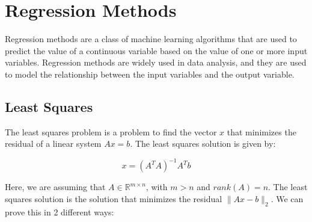 \section{Regression Methods}

Regression methods are a class of machine learning algorithms that are used to predict the value of a continuous
variable based on the value of one or more input variables. Regression methods are widely used in data analysis,
and they are used to model the relationship between the input variables and the output variable.

\subsection{Least Squares}

The least squares problem is a problem to find the vector $x$ that minimizes the residual of a linear system $A x = b$.
The least squares solution is given by:

\begin{equation}
    x = (A^T A)^{-1} A^T b
\end{equation}

Here, we are assuming that $A \in \mathbb{R}^{m \times n}$, with $m > n$ and $rank(A) = n$. The least squares solution
is the solution that minimizes the residual $\|A x - b\|_2$. We can prove this in 2 different ways:

